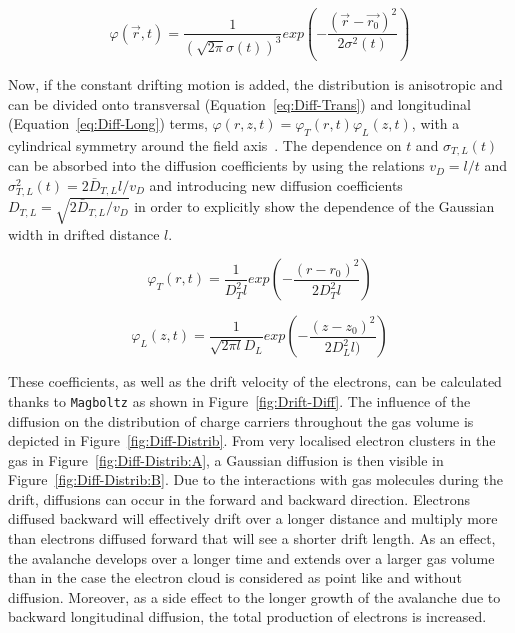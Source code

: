 	\begin{equation}
	\label{eq:Diff-Gauss}
	\varphi(\overrightarrow{r},t) = \frac{1}{\left(\sqrt{2\pi}\sigma(t)\right)^3} exp\left( -\frac{(\overrightarrow{r} - \overrightarrow{r_0})^2}{2\sigma^2(t)} \right)
	\end{equation}
	
	Now, if the constant drifting motion is added, the distribution is anisotropic and can be divided onto transversal (Equation~\ref{eq:Diff-Trans}) and longitudinal (Equation~\ref{eq:Diff-Long}) terms, $\varphi(r,z,t) = \varphi_T(r,t)\varphi_L(z,t)$, with a cylindrical symmetry around the field axis~\cite{LIPPMANN2003}. The dependence on $t$ and $\sigma_{T,L}(t)$ can be absorbed into the diffusion coefficients by using the relations $v_D = l/t$ and $\sigma_{T,L}^2(t) = 2\bar{D}_{T,L}l/v_D$ and introducing new diffusion coefficients $D_{T,L} = \sqrt{2\bar{D}_{T,L}/v_D}$ in order to explicitly show the dependence of the Gaussian width in drifted distance $l$.
	
	\begin{equation}
	\label{eq:Diff-Trans}
	\varphi_T(r,t) = \frac{1}{D_T^2l} exp\left( -\frac{(r - r_0)^2}{2D_T^2l} \right)
	\end{equation}
	
\endgroup
	
	\begin{equation}
	\label{eq:Diff-Long}
	\varphi_L(z,t) = \frac{1}{\sqrt{2\pi l}D_L} exp\left( -\frac{(z - z_0)^2}{2D_L^2l)} \right)
	\end{equation}
	
	These coefficients, as well as the drift velocity of the electrons, can be calculated thanks to \texttt{Magboltz} as shown in Figure~\ref{fig:Drift-Diff}. The influence of the diffusion on the distribution of charge carriers throughout the gas volume is depicted in Figure~\ref{fig:Diff-Distrib}. From very localised electron clusters in the gas in Figure~\ref{fig:Diff-Distrib:A}, a Gaussian diffusion is then visible in Figure~\ref{fig:Diff-Distrib:B}. Due to the interactions with gas molecules during the drift, diffusions can occur in the forward and backward direction. Electrons diffused backward will effectively drift over a longer distance and multiply more than electrons diffused forward that will see a shorter drift length. As an effect, the avalanche develops over a longer time and extends over a larger gas volume than in the case the electron cloud is considered as point like and without diffusion. Moreover, as a side effect to the longer growth of the avalanche due to backward longitudinal diffusion, the total production of electrons is increased.
	
